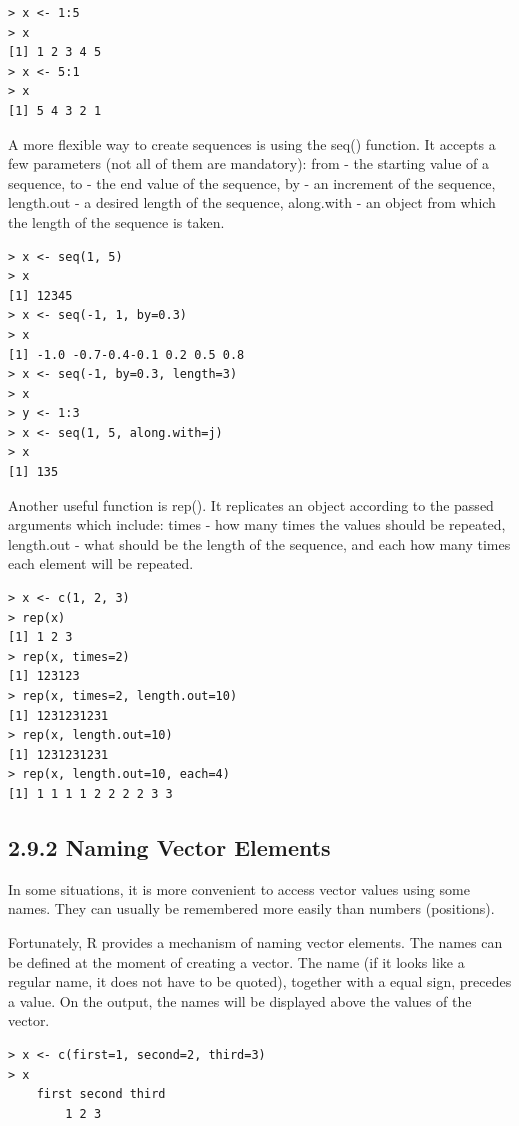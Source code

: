 \documentclass[10pt]{book}
\begin{document}
\begin{verbatim}
> x <- 1:5
> x
[1] 1 2 3 4 5
> x <- 5:1
> x
[1] 5 4 3 2 1
\end{verbatim}

A more flexible way to create sequences is using the seq() function. It accepts a few parameters (not all of them are mandatory): from - the starting value of a sequence, to - the end value of the sequence, by - an increment of the sequence, length.out - a desired length of the sequence, along.with - an object from which the length of the sequence is taken.

\begin{verbatim}
> x <- seq(1, 5)
> x
[1] 12345
> x <- seq(-1, 1, by=0.3)
> x
[1] -1.0 -0.7-0.4-0.1 0.2 0.5 0.8
> x <- seq(-1, by=0.3, length=3)
> x
> y <- 1:3
> x <- seq(1, 5, along.with=j)
> x
[1] 135
\end{verbatim}

Another useful function is rep(). It replicates an object according to the passed arguments which include: times - how many times the values should be repeated, length.out - what should be the length of the sequence, and each how many times each element will be repeated.

\begin{verbatim}
> x <- c(1, 2, 3)
> rep(x)
[1] 1 2 3
> rep(x, times=2)
[1] 123123
> rep(x, times=2, length.out=10)
[1] 1231231231
> rep(x, length.out=10)
[1] 1231231231
> rep(x, length.out=10, each=4)
[1] 1 1 1 1 2 2 2 2 3 3
\end{verbatim}

\subsection*{2.9.2 Naming Vector Elements}
In some situations, it is more convenient to access vector values using some names. They can usually be remembered more easily than numbers (positions).

Fortunately, R provides a mechanism of naming vector elements. The names can be defined at the moment of creating a vector. The name (if it looks like a regular name, it does not have to be quoted), together with a equal sign, precedes a value. On the output, the names will be displayed above the values of the vector.

\begin{verbatim}
> x <- c(first=1, second=2, third=3)
> x
    first second third
        1 2 3
\end{verbatim}
\end{document}
